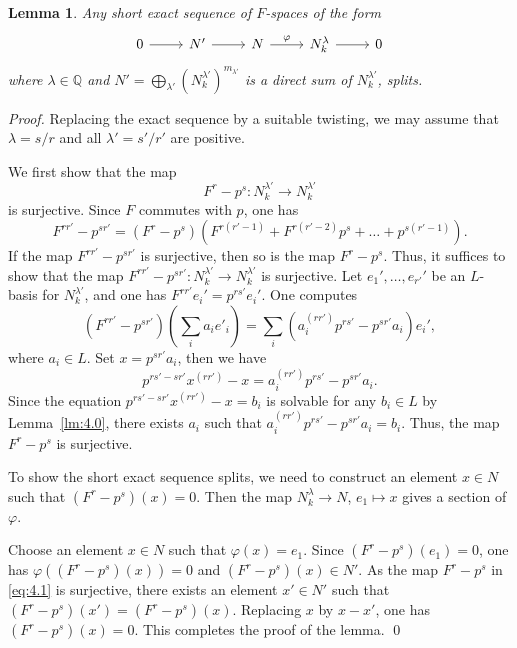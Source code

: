 \documentclass[]{amsart}
\theoremstyle{plain}
\newtheorem{lemma}[thm]{Lemma}
\theoremstyle{definition}
\theoremstyle{remark}
\newcommand{\Q}{\mathbb Q}
\newcommand{\<}{\langle}   %
\renewcommand{\>}{\rangle} %
\begin{document}
\begin{lemma}\label{lm:4.1}
   Any short exact sequence of $F$-spaces of the form
   \[
   \begin{tikzcd}
       0 \arrow[r] & N' \arrow[r] & N \arrow[r,"\varphi"] & N_k^{\lambda} \arrow[r] & 0
   \end{tikzcd} \]
   where $\lambda\in \Q$ and $N'=\bigoplus_{\lambda'} (N_k^{\lambda'})^{m_{\lambda'}}$ is a direct sum of $N_k^{\lambda'}$, splits. 
\end{lemma}
\begin{proof}
    Replacing the exact sequence by a suitable twisting, we may assume that $\lambda=s/r$ and all $\lambda'=s'/r'$ are positive. 

    We first show that the map 
    \begin{equation}\label{eq:4.1}
        F^r-p^s: N_k^{\lambda'} \to N_k^{\lambda'}
    \end{equation}
    is surjective. Since $F$ commutes with $p$, one has
    \[ F^{rr'}-p^{sr'}=(F^r-p^s)(F^{r(r'-1)}+F^{r(r'-2)}p^{s}+\dots+p^{s(r'-1)}). \]
    If the map $F^{rr'}-p^{sr'}$ is surjective, then so is the map $F^r-p^s$. Thus, it suffices to show that the map $F^{rr'}-p^{sr'}:N_k^{\lambda'} \to N_k^{\lambda'}$ is surjective. Let $e_1',\dots , e_{r'}'$ be an $L$-basis for $N_k^{\lambda'}$, and one has $F^{rr'}e_i'=p^{rs'}e_i'$. One computes
    \[ (F^{rr'}-p^{sr'})\left(\sum_i a_ie'_i\right )=\sum_i (a_i^{(rr')}p^{rs'}-p^{sr'}a_i) e_i',\]
    where $a_i\in L$. Set $x=p^{sr'}a_i$, then we have 
    \[ p^{rs'-sr'} x^{(rr')}-x=a_i^{(rr')}p^{rs'}-p^{sr'}a_i.\]
    Since the equation $p^{rs'-sr'} x^{(rr')}-x=b_i$ is solvable for any $b_i\in L$ by Lemma~\ref{lm:4.0},  there exists $a_i$ such that $a_i^{(rr')}p^{rs'}-p^{sr'}a_i=b_i$. Thus, the map $F^r-p^s$ is surjective. 

    To show the short exact sequence splits, we need to construct an element $x\in N$ such that $(F^r-p^s)(x)=0$. Then the map $N_k^\lambda \to N$, $e_1 \mapsto x$ gives a section of $\varphi$. 
    
    Choose an element $x\in N$ such that $\varphi(x)=e_1$. Since $(F^r-p^s)(e_1)=0$, one has $\varphi((F^r-p^s)(x))=0$ and $(F^r-p^s)(x)\in N'$. As the map $F^r-p^s$ in \eqref{eq:4.1} is surjective, there exists an element $x'\in N'$ such that $(F^r-p^s)(x')=(F^r-p^s)(x)$.  Replacing $x$ by $x-x'$, one has $(F^r-p^s)(x)=0$. This completes the proof of the lemma. \qed    
\end{proof}
\end{document}
